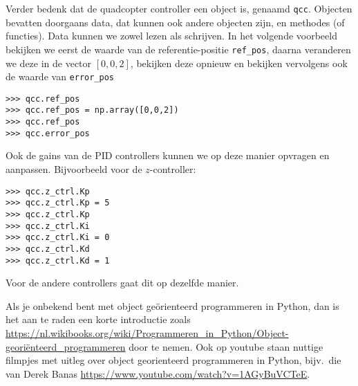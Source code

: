 \documentclass[a4paper,11pt]{article}
\begin{document}
\begin{table}

\end{table}
Verder bedenk dat de quadcopter controller een object is, genaamd \texttt{qcc}. Objecten bevatten doorgaans data, dat kunnen ook andere objecten zijn, en methodes (of functies). Data kunnen we zowel lezen als schrijven. In het volgende voorbeeld bekijken we eerst de waarde van de referentie-positie \texttt{ref\_pos}, daarna veranderen we deze in de vector $\left[0,0,2\right]$, bekijken deze opnieuw en bekijken vervolgens ook de waarde van \texttt{error\_pos}
\begin{verbatim}
>>> qcc.ref_pos
>>> qcc.ref_pos = np.array([0,0,2])
>>> qcc.ref_pos
>>> qcc.error_pos
\end{verbatim}
Ook de gains van de PID controllers kunnen we op deze manier opvragen en aanpassen. Bijvoorbeeld voor de $z$-controller:
\begin{verbatim}
>>> qcc.z_ctrl.Kp
>>> qcc.z_ctrl.Kp = 5
>>> qcc.z_ctrl.Kp
>>> qcc.z_ctrl.Ki
>>> qcc.z_ctrl.Ki = 0
>>> qcc.z_ctrl.Kd
>>> qcc.z_ctrl.Kd = 1
\end{verbatim}
Voor de andere controllers gaat dit op dezelfde manier. 

Als je onbekend bent met object ge\"orienteerd programmeren in Python, dan is
het aan te raden een korte introductie zoals
\url{https://nl.wikibooks.org/wiki/Programmeren_in_Python/Object-georiënteerd_programmeren}
door te nemen. Ook op youtube staan nuttige filmpjes met uitleg over object
georienteerd programmeren in Python, bijv.\ die van Derek Banas
\url{https://www.youtube.com/watch?v=1AGyBuVCTeE}.
\end{document}
